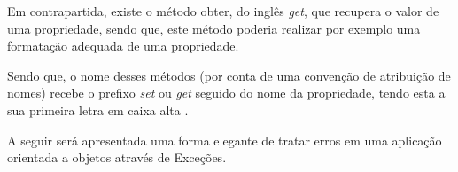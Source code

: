 Em contrapartida, existe o método obter, do inglês \textit{get}, que recupera o
valor de uma propriedade, sendo que, este método poderia realizar por exemplo uma
formatação adequada de uma propriedade.

Sendo que, o nome desses métodos (por conta de uma convenção de atribuição de
nomes) recebe o prefixo \textit{set} ou \textit{get} seguido do nome da
propriedade, tendo esta a sua primeira letra em caixa alta \cite{javaComoProgramar}.

A seguir será apresentada uma forma elegante de tratar erros em uma aplicação
orientada a objetos através de Exceções.